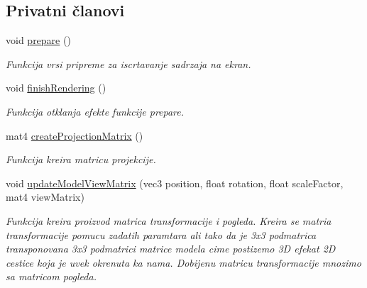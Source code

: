 \subsection*{Privatni članovi}
\begin{DoxyCompactItemize}
\item 
void \hyperlink{classparticle_1_1ParticleRenderer_a213703d9e95935b0b10f13363eff9748}{prepare} ()
\begin{DoxyCompactList}\small\item\em Funkcija vrsi pripreme za iscrtavanje sadrzaja na ekran. \end{DoxyCompactList}\item 
void \hyperlink{classparticle_1_1ParticleRenderer_ae0a3632a3579890f93aeade2096d6d58}{finish\+Rendering} ()
\begin{DoxyCompactList}\small\item\em Funkcija otklanja efekte funkcije prepare. \end{DoxyCompactList}\item 
mat4 \hyperlink{classparticle_1_1ParticleRenderer_ad16ef052cf8dbf03a0bfa6f06066a37f}{create\+Projection\+Matrix} ()
\begin{DoxyCompactList}\small\item\em Funkcija kreira matricu projekcije. \end{DoxyCompactList}\item 
void \hyperlink{classparticle_1_1ParticleRenderer_ae64e00bf0caa69f822efcda262e4ba89}{update\+Model\+View\+Matrix} (vec3 position, float rotation, float scale\+Factor, mat4 view\+Matrix)
\begin{DoxyCompactList}\small\item\em Funkcija kreira proizvod matrica transformacije i pogleda. Kreira se matria transformacije pomucu zadatih paramtara ali tako da je 3x3 podmatrica transponovana 3x3 podmatrici matrice modela cime postizemo 3D efekat 2D cestice koja je uvek okrenuta ka nama. Dobijenu matricu transformacije mnozimo sa matricom pogleda. \end{DoxyCompactList}\end{DoxyCompactItemize}
